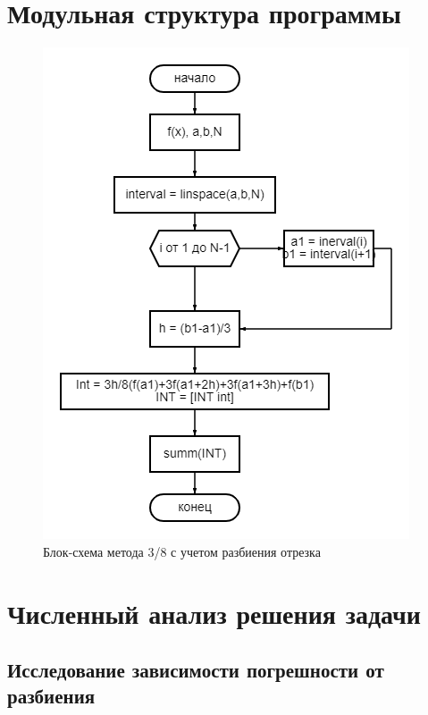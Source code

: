 \documentclass[a4paper]{article}
\begin{document}
\newpage
\section{Модульная структура программы} 
 
\begin{figure}[h!]
\begin{center}
\includegraphics[scale=0.7]{схема с разбиением.png} 
\end{center}
\caption{Блок-схема метода 3/8 с учетом разбиения отрезка} \label{Рис1}
\end{figure}

\newpage
\section{Численный анализ решения задачи}


\subsection{Исследование зависимости погрешности от разбиения} 
\end{document}
